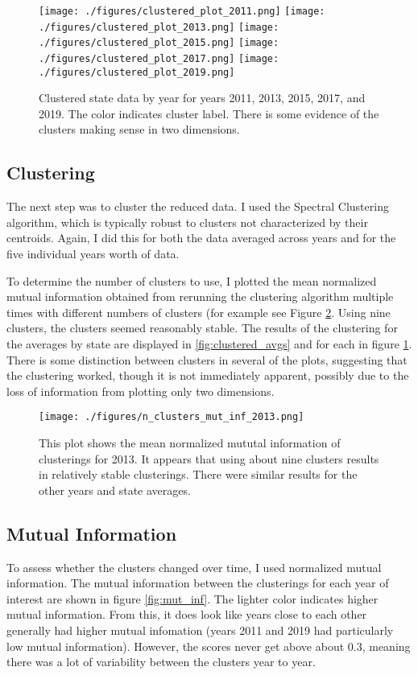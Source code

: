 \documentclass[11pt]{article}
\begin{document}
\begin{figure}[hp]
\texttt{[image: ./figures/clustered\_plot\_2011.png]}
\texttt{[image: ./figures/clustered\_plot\_2013.png]}
\texttt{[image: ./figures/clustered\_plot\_2015.png]}
\texttt{[image: ./figures/clustered\_plot\_2017.png]}
\texttt{[image: ./figures/clustered\_plot\_2019.png]}
\caption{
  Clustered state data by year for years 2011, 2013, 2015, 2017, and 2019. The color indicates cluster label. There is some evidence of the clusters making sense in two dimensions.
}
\label{fig:clustered_data}
\end{figure}

\subsection{Clustering}
The next step was to cluster the reduced data. I used the Spectral Clustering algorithm, which is typically robust to clusters not characterized by their centroids. Again, I did this for both the data averaged across years and for the five individual years worth of data. 

To determine the number of clusters to use, I plotted the mean normalized mutual information obtained from rerunning the clustering algorithm multiple times with different numbers of clusters (for example see Figure \ref{fig:n_clusters}. Using nine clusters, the clusters seemed reasonably stable. The results of the clustering for the averages by state are displayed in \ref{fig:clustered_avgs} and for each in figure \ref{fig:clustered_data}. There is some distinction between clusters in several of the plots, suggesting that the clustering worked, though it is not immediately apparent, possibly due to the loss of information from plotting only two dimensions.

\begin{figure}[hp]
\texttt{[image: ./figures/n\_clusters\_mut\_inf\_2013.png]}
\caption{
  This plot shows the mean normalized mututal information of clusterings for 2013. It appears that using about nine clusters results in relatively stable clusterings. There were similar results for the other years and state averages. 
}
\label{fig:n_clusters}
\end{figure}

\subsection{Mutual Information}
To assess whether the clusters changed over time, I used normalized mutual information. The mutual information between the clusterings for each year of interest are shown in figure \ref{fig:mut_inf}. The lighter color indicates higher mutual information. From this, it does look like years close to each other generally had higher mutual infomation (years 2011 and 2019 had particularly low mutual information). However, the scores never get above about 0.3, meaning there was a lot of variability between the clusters year to year. 
\end{document}
